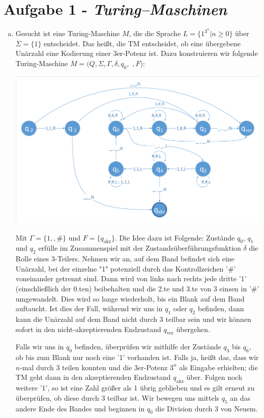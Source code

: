 \documentclass{article}
\begin{document}
\section*{Aufgabe 1 - \textit{Turing–Maschinen}}
\begin{enumerate}[a)]
	\item Gesucht ist eine Turing-Maschine $M$, die die Sprache $L = \{1^{3^n} | n \ge 0\}$ über $\Sigma = \{1\}$ entscheidet. Das heißt, die TM entscheidet, ob eine übergebene Unärzahl eine Kodierung einer 3er-Potenz ist. Dazu konstruieren wir folgende Turing-Maschine $M = (Q, \Sigma, \Gamma, \delta, q_0,$ \textvisiblespace $, F)$:
	
	\includegraphics[width=\textwidth,page=1,trim={2 2 2 4},clip]{diagramme.pdf}
	
	Mit $\Gamma = \{1,$\textvisiblespace$, \#\}$ und $F = \{q_\text{akz}\}$. Die Idee dazu ist Folgende: Zustände $q_0$, $q_1$ und $q_2$ erfülle im Zusammenspiel mit der Zustandsüberführungsfunktion $\delta$ die Rolle eines 3-Teilers. Nehmen wir an, auf dem Band befindet sich eine Unärzahl, bei der einzelne "1" potenziell durch das Kontrollzeichen '\#' voneinander getrennt sind. Dann wird von links nach rechts jede dritte '1' (einschließlich der 0.ten) beibehalten und die 2.te und 3.te von 3 einsen in '\#' umgewandelt. Dies wird so lange wiederholt, bis ein Blank auf dem Band auftaucht. Ist dies der Fall, während wir uns in $q_1$ oder $q_2$ befinden, dann kann die Unärzahl auf dem Band nicht durch 3 teilbar sein und wir können sofort in den nicht-akzeptierenden Endzustand $q_\text{ver}$ übergehen.
	
	Falls wir uns in $q_0$ befinden, überprüfen wir mithilfe der Zustände $q_3$ bis $q_6$, ob bis zum Blank nur noch eine '1' vorhanden ist. Falls ja, heißt das, dass wir $n$-mal durch 3 teilen konnten und die 3er-Potenz $3^n$ als Eingabe erhielten; die TM geht dann in den akzeptierenden Endzustand $q_\text{akz}$ über. Folgen noch weitere '1', so ist eine Zahl größer als 1 übrig geblieben und es gilt erneut zu überprüfen, ob diese durch 3 teilbar ist. Wir bewegen uns mittels $q_5$ an das andere Ende des Bandes und beginnen in $q_0$ die Division durch 3 von Neuem.
	

\end{enumerate}
\end{document}
